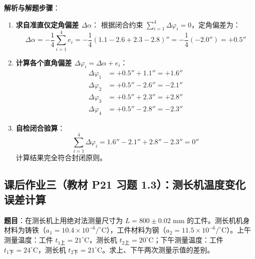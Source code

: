 \documentclass[11pt,a4paper]{ctexart}
\begin{document}
\vspace{4pt}
\noindent\textbf{解析与解题步骤}：
\begin{enumerate}[leftmargin=1.5em, itemsep=3pt]
    \item \textbf{求自准直仪定角偏差 $\Delta\alpha$}：
    根据闭合约束 $\sum_{i=1}^4 \Delta\varphi_i = 0$，定角偏差为：
    \[ \Delta\alpha = -\frac{1}{4}\sum_{i=1}^4 e_i = -\frac{1}{4} \left( 1.1 - 2.6 + 2.3 - 2.8 \right)'' = -\frac{1}{4} (-2.0'') = +0.5'' \]
    
    \item \textbf{计算各个直角偏差 $\Delta\varphi_i = \Delta\alpha + e_i$}：
    \begin{align*}
    \Delta\varphi_1 &= +0.5'' + 1.1'' = \mathbf{+1.6''} \\
    \Delta\varphi_2 &= +0.5'' - 2.6'' = \mathbf{-2.1''} \\
    \Delta\varphi_3 &= +0.5'' + 2.3'' = \mathbf{+2.8''} \\
    \Delta\varphi_4 &= +0.5'' - 2.8'' = \mathbf{-2.3''}
    \end{align*}
    
    \item \textbf{自检闭合验算}：
    \[ \sum_{i=1}^4 \Delta\varphi_i = 1.6'' - 2.1'' + 2.8'' - 2.3'' = 0'' \]
    计算结果完全符合封闭原则。
\end{enumerate}

\subsection{课后作业三（教材 P21 习题 1.3）：测长机温度变化误差计算}
\noindent\textbf{题目}：在测长机上用绝对法测量尺寸为 $L = 800 \pm 0.02\text{ mm}$ 的工件。测长机机身材料为铸铁（$a_1 = 10.4 \times 10^{-6}/^\circ\mathrm{C}$），工件材料为钢（$a_2 = 11.5 \times 10^{-6}/^\circ\mathrm{C}$）。上午测量温度：工件 $t_{1\text{上}} = 21^\circ\mathrm{C}$，测长机 $t_{2\text{上}} = 20^\circ\mathrm{C}$；下午测量温度：工件 $t_{1\text{下}} = 24^\circ\mathrm{C}$，测长机 $t_{2\text{下}} = 21^\circ\mathrm{C}$。求上、下午两次测量示值的差别。
\end{document}
